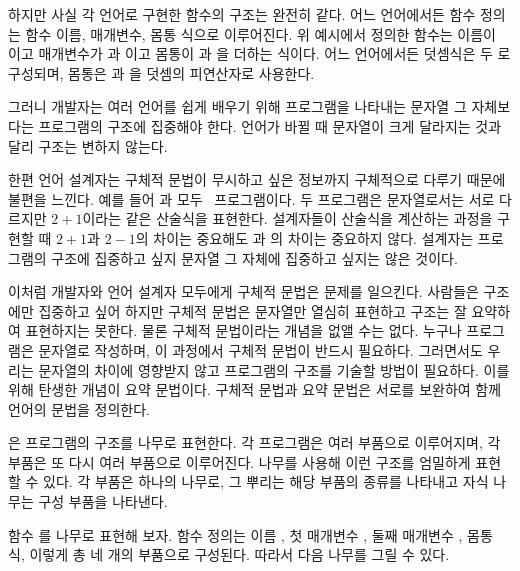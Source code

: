 하지만 사실 각 언어로 구현한 함수의 구조는 완전히 같다. 어느 언어에서든 함수
정의는 함수 이름, 매개변수, 몸통 식으로 이루어진다. 위 예시에서 정의한 함수는
이름이 이고 매개변수가 과 이고 몸통이 과
을 더하는 식이다. 어느 언어에서든 덧셈식은 두 로
구성되며, 몸통은 과 을 덧셈의 피연산자로 사용한다.

그러니 개발자는 여러 언어를 쉽게 배우기 위해 프로그램을 나타내는 문자열 그
자체보다는 프로그램의 구조에 집중해야 한다. 언어가 바뀔 때 문자열이 크게
달라지는 것과 달리 구조는 변하지 않는다.

한편 언어 설계자는 구체적 문법이 무시하고 싶은 정보까지 구체적으로 다루기 때문에
불편을 느낀다. 예를 들어 과  모두 \Lang~프로그램이다.
두 프로그램은 문자열로서는 서로 다르지만 $2+1$이라는 같은 산술식을 표현한다.
 설계자들이 산술식을 계산하는 과정을 구현할 때 $2+1$과 $2-1$의 차이는
중요해도 과 의 차이는 중요하지 않다. 설계자는
프로그램의 구조에 집중하고 싶지 문자열 그 자체에 집중하고 싶지는 않은 것이다.

이처럼 개발자와 언어 설계자 모두에게 구체적 문법은 문제를 일으킨다. 사람들은
구조에만 집중하고 싶어 하지만 구체적 문법은 문자열만 열심히 표현하고 구조는 잘
요약하여 표현하지는 못한다. 물론 구체적 문법이라는 개념을 없앨 수는 없다. 누구나
프로그램은 문자열로 작성하며, 이 과정에서 구체적 문법이 반드시 필요하다.
그러면서도 우리는 문자열의 차이에 영향받지 않고 프로그램의 구조를 기술할 방법이
필요하다. 이를 위해 탄생한 개념이 요약 문법이다. 구체적 문법과 요약 문법은
서로를 보완하여 함께 언어의 문법을 정의한다.

은 프로그램의 구조를 나무로 표현한다. 각 프로그램은 여러 부품으로
이루어지며, 각 부품은 또 다시 여러 부품으로 이루어진다. 나무를 사용해 이런
구조를 엄밀하게 표현할 수 있다. 각 부품은 하나의 나무로, 그 뿌리는 해당 부품의
종류를 나타내고 자식 나무는 구성 부품을 나타낸다.

함수 를 나무로 표현해 보자. 함수 정의는 이름 , 첫 매개변수
, 둘째 매개변수 , 몸통 식, 이렇게 총 네 개의 부품으로 구성된다.
따라서 다음 나무를 그릴 수 있다.

\begin{center}
\end{center}

